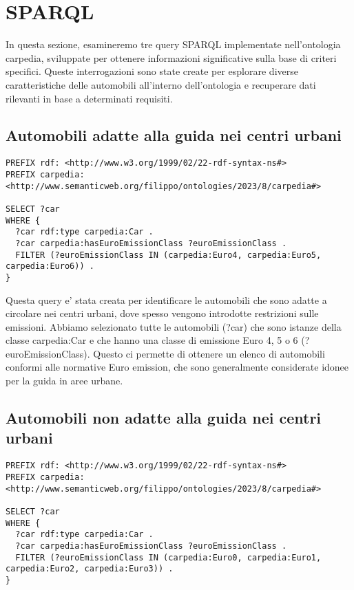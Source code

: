 \section{SPARQL}\label{sec:sparql}

In questa sezione, esamineremo tre query SPARQL implementate nell'ontologia carpedia,
sviluppate per ottenere informazioni significative sulla base di criteri specifici.
Queste interrogazioni sono state create per esplorare diverse caratteristiche delle automobili all'interno
dell'ontologia e recuperare dati rilevanti in base a determinati requisiti.

\subsection{Automobili adatte alla guida nei centri urbani}

\begin{lstlisting}[language=SPARQL]
PREFIX rdf: <http://www.w3.org/1999/02/22-rdf-syntax-ns#>
PREFIX carpedia: <http://www.semanticweb.org/filippo/ontologies/2023/8/carpedia#>

SELECT ?car
WHERE {
  ?car rdf:type carpedia:Car .
  ?car carpedia:hasEuroEmissionClass ?euroEmissionClass .
  FILTER (?euroEmissionClass IN (carpedia:Euro4, carpedia:Euro5, carpedia:Euro6)) .
}
\end{lstlisting}


Questa query e' stata creata per identificare le automobili che sono adatte a circolare nei centri urbani,
dove spesso vengono introdotte restrizioni sulle emissioni.
Abbiamo selezionato tutte le automobili (?car) che sono istanze della classe carpedia:Car e che hanno una
classe di emissione Euro 4, 5 o 6 (?euroEmissionClass).
Questo ci permette di ottenere un elenco di automobili conformi alle normative Euro emission, che sono generalmente
considerate idonee per la guida in aree urbane.

\subsection{Automobili non adatte alla guida nei centri urbani}

\begin{lstlisting}[language=SPARQL]
PREFIX rdf: <http://www.w3.org/1999/02/22-rdf-syntax-ns#>
PREFIX carpedia: <http://www.semanticweb.org/filippo/ontologies/2023/8/carpedia#>

SELECT ?car
WHERE {
  ?car rdf:type carpedia:Car .
  ?car carpedia:hasEuroEmissionClass ?euroEmissionClass .
  FILTER (?euroEmissionClass IN (carpedia:Euro0, carpedia:Euro1, carpedia:Euro2, carpedia:Euro3)) .
}
\end{lstlisting}

